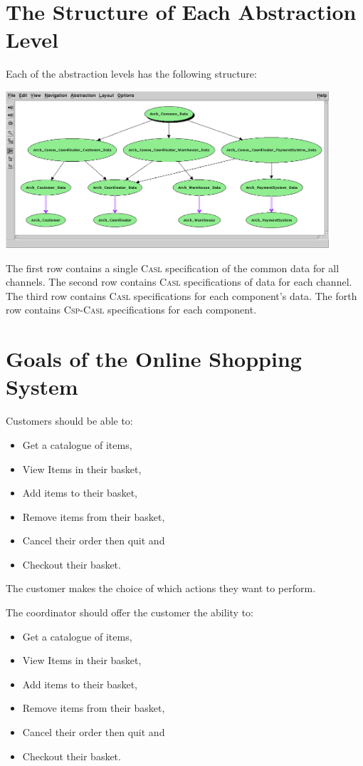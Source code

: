 \documentclass[12pt]{article}
\newcommand{\CASL}{\textrm{\textsc{Casl}}\xspace}
\newcommand{\CC}{\textrm{\textsc{Csp}-\textsc{Casl}}\xspace}
\begin{document}
\section{The Structure of Each Abstraction Level}

Each of the abstraction levels has the following structure:

\begin{center}
  \includegraphics[width=0.9\textwidth]{Hets.png}
\end{center}

The first row contains a single \CASL specification of the common data
for all channels. The second row contains \CASL specifications of
data for each channel. The third row contains \CASL specifications
for each component's data. The forth row contains \CC specifications
for each component.

\section{Goals of the Online Shopping System}

Customers should be able to:
\begin{itemize}
    \item Get a catalogue of items,
    \item View Items in their basket,
    \item Add items to their basket,
    \item Remove items from their basket,
    \item Cancel their order then quit and
    \item Checkout their basket.
\end{itemize}
The customer makes the choice of which actions they want to perform.

The coordinator should offer the customer the ability to:
\begin{itemize}
    \item Get a catalogue of items,
    \item View Items in their basket,
    \item Add items to their basket,
    \item Remove items from their basket,
    \item Cancel their order then quit and
    \item Checkout their basket.
\end{itemize}
\end{document}
